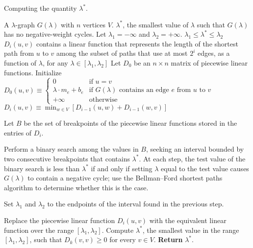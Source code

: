 \documentclass{llncs}
\begin{document}
\begin{algorithm}[p]
\caption{Computing the quantity $\lambda^*$.}
\label{algorithm:computing_lambda_star}
\begin{algorithmic}[1]
 A $\lambda$-graph $G(\lambda)$ with $n$ vertices $V$.
 $\lambda^*$, the smallest value of $\lambda$ such that $G(\lambda)$ has no negative-weight cycles.
\STATE Let $\lambda_1 = -\infty$ and $\lambda_2 = +\infty$.
 $\lambda_1 \leq \lambda^* \leq \lambda_2$
 $D_i(u,v)$ contains a linear function that represents the length of the shortest path from $u$ to $v$ among the subset of paths that use at most $2^i$ edges, as a function of $\lambda$, for any $\lambda \in [\lambda_1,\lambda_2]$
\STATE Let $D_0$ be an $n \times n$ matrix of piecewise linear functions.
\STATE Initialize $D_0(u,v) \equiv \left\{ \begin{array}{ll}
                            0 & \mbox{if $u=v$} \\
                            \lambda\cdot m_e + b_e & \mbox{if $G(\lambda)$ contains an edge $e$ from $u$ to $v$} \\
                            +\infty & \mbox{otherwise}
                            \end{array} \right .$
    \STATE $D_i(u,v) \equiv \min_{w \in V} [D_{i-1}(u,w) + D_{i-1}(w,v)]$ \label{line:define_D}
  \ENDFOR

  \STATE Let $B$ be the set of breakpoints of the piecewise linear functions stored in the entries of $D_i$.

  \STATE Perform a binary search among the values in $B$, seeking an interval bounded by two consecutive breakpoints that contains $\lambda^*$. At each step, the test value of the binary search is less than $\lambda^*$ if and only if setting $\lambda$ equal to the test value causes $G(\lambda)$ to contain a negative cycle; use the Bellman--Ford shortest paths algorithm to determine whether this is the case.

  \STATE Set $\lambda_1$ and $\lambda_2$ to the endpoints of the interval found in the previous step.

    \STATE Replace the piecewise linear function $D_i(u,v)$ with the equivalent linear function over the range $[\lambda_1, \lambda_2]$. \label{line:simplify_D}
  \ENDFOR  
\ENDFOR
\STATE Compute $\lambda^*$, the smallest value in the range $[\lambda_1, \lambda_2]$, such that $D_k(v,v) \geq 0$ for every $v \in V$.
\STATE \textbf{Return} $\lambda^*$.
\end{algorithmic}
\end{algorithm}
\end{document}
